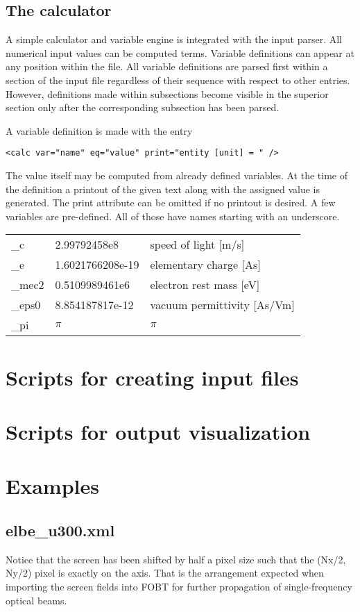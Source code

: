 \documentclass[11pt]{article}
\begin{document}

\subsection{The calculator}

A simple calculator and variable engine is integrated with
the input parser. All numerical input values can be computed terms.
Variable definitions can appear at any position within the file.
All variable definitions are parsed first within a section of the input file
regardless of their sequence with respect to other entries.
However, definitions made within subsections become visible in
the superior section only after the corresponding subsection has been parsed.

A variable definition is made with the entry
\begin{lstlisting}
<calc var="name" eq="value" print="entity [unit] = " />
\end{lstlisting}
The value itself may be computed from already defined variables.
At the time of the definition a printout of the given text along with the
assigned value is generated. The print attribute can be omitted if no printout is desired.
A few variables are pre-defined. All of those have names starting with an underscore.
\\[1ex]
\begin{tabular}{lll}
\_c & 2.99792458e8 & speed of light [m/s] \\
\_e & 1.6021766208e-19 & elementary charge [As] \\
\_mec2 & 0.5109989461e6 & electron rest mass [eV] \\
\_eps0 & 8.854187817e-12 & vacuum permittivity [As/Vm] \\
\_pi & $\pi$ & $\pi$ \\
\end{tabular}

\section{Scripts for creating input files}

\section{Scripts for output visualization}

\section{Examples}

\subsection{elbe_u300.xml}

Notice that the screen has been shifted by half a pixel size
such that the (Nx/2, Ny/2) pixel is exactly on the axis.
That is the arrangement expected when importing the screen fields into FOBT
for further propagation of single-frequency optical beams.
\end{document}
